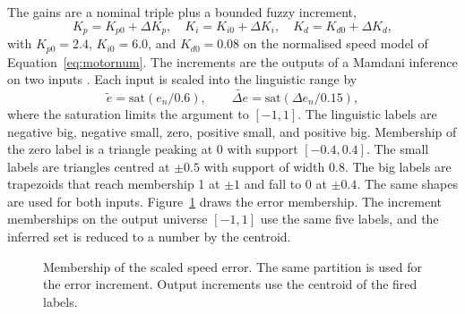 The gains are a nominal triple plus a bounded fuzzy increment,
\begin{equation}
K_p = K_{p0}+\Delta K_p,\quad
K_i = K_{i0}+\Delta K_i,\quad
K_d = K_{d0}+\Delta K_d,
\label{eq:gainsplit}
\end{equation}
with $K_{p0}=2.4$, $K_{i0}=6.0$, and $K_{d0}=0.08$ on the normalised speed model of Equation~\eqref{eq:motornum}. The increments are the outputs of a Mamdani inference on two inputs \cite{mamdani1974,zadeh1965}. Each input is scaled into the linguistic range by
\begin{equation}
\tilde e = \mathrm{sat}(e_n/0.6),\qquad \widetilde{\Delta e}=\mathrm{sat}(\Delta e_n/0.15),
\label{eq:scalee}
\end{equation}
where the saturation limits the argument to $[-1,1]$. The linguistic labels are negative big, negative small, zero, positive small, and positive big. Membership of the zero label is a triangle peaking at 0 with support $[-0.4,0.4]$. The small labels are triangles centred at $\pm 0.5$ with support of width 0.8. The big labels are trapezoids that reach membership 1 at $\pm 1$ and fall to 0 at $\pm 0.4$. The same shapes are used for both inputs. Figure~\ref{fig:member} draws the error membership. The increment memberships on the output universe $[-1,1]$ use the same five labels, and the inferred set is reduced to a number by the centroid.

\begin{figure}[htbp]
\centering
{}
\caption{Membership of the scaled speed error. The same partition is used for the error increment. Output increments use the centroid of the fired labels.}
\label{fig:member}
\end{figure}

